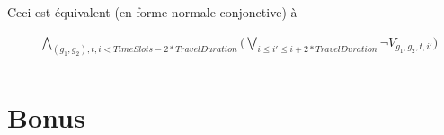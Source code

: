 \documentclass[a4paper]{article}
\begin{document}
Ceci est équivalent (en forme normale conjonctive) à

\begin{equation*}
    \begin{split}
      & \bigwedge_{(g_1, g_2), t, i < TimeSlots - 2 * TravelDuration}         
         \big( 
        \bigvee_{i \leq i' \leq i + 2 * TravelDuration} 
        \neg V_{g_1, g_2, t, i'} \big) \\
    \end{split}
\end{equation*}

\section{Bonus}
\end{document}
